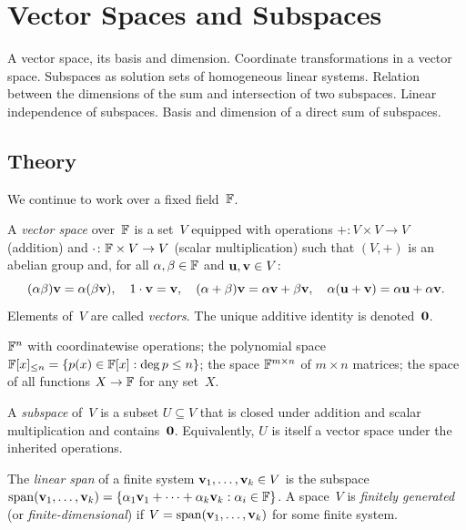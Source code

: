 
\section{Vector Spaces and Subspaces}
\label{sec:1.1.04-vector-spaces}

\begin{ticket}
A vector space, its basis and dimension. Coordinate transformations in a vector space. Subspaces as solution sets of homogeneous linear systems. Relation between the dimensions of the sum and intersection of two subspaces. Linear independence of subspaces. Basis and dimension of a direct sum of subspaces.
\end{ticket}

\subsection*{Theory}

We continue to work over a fixed field~$\mathbb{F}$.

\begin{definition}
\label{def:vector-space}
A \emph{vector space} over~$\mathbb{F}$ is a set~$V$ equipped with operations
$+\colon V \times V \to V$ (addition) and
$\cdot\colon \mathbb{F} \times V \to V$ (scalar multiplication) such that
$(V, +)$ is an abelian group and, for all $\alpha, \beta \in \mathbb{F}$ and
$\mathbf{u}, \mathbf{v} \in V$:
\[
  (\alpha \beta)\mathbf{v} = \alpha(\beta \mathbf{v}), \quad
  1 \cdot \mathbf{v} = \mathbf{v}, \quad
  (\alpha + \beta)\mathbf{v} = \alpha \mathbf{v} + \beta \mathbf{v}, \quad
  \alpha(\mathbf{u} + \mathbf{v}) = \alpha \mathbf{u} + \alpha \mathbf{v}.
\]
Elements of~$V$ are called \emph{vectors}. The unique additive identity
is denoted~$\mathbf{0}$.
\end{definition}

\begin{example}
\label{ex:vector-space-examples}
$\mathbb{F}^n$ with coordinatewise operations; the polynomial space
$\mathbb{F}[x]_{\le n} = \{p(x) \in \mathbb{F}[x] : \deg p \le n\}$; the space
$\mathbb{F}^{m \times n}$ of $m \times n$ matrices; the space of all
functions $X \to \mathbb{F}$ for any set~$X$.
\end{example}

\begin{definition}
\label{def:subspace}
A \emph{subspace} of~$V$ is a subset $U \subseteq V$ that is closed
under addition and scalar multiplication and contains~$\mathbf{0}$.
Equivalently, $U$ is itself a vector space under the inherited
operations.

The \emph{linear span} of a finite system $\mathbf{v}_1, \dots, \mathbf{v}_k \in V$
is the subspace
$\operatorname{span}(\mathbf{v}_1, \dots, \mathbf{v}_k) = \{\alpha_1 \mathbf{v}_1 + \dots + \alpha_k \mathbf{v}_k : \alpha_i \in \mathbb{F}\}$.
A space~$V$ is \emph{finitely generated} (or \emph{finite-dimensional})
if $V = \operatorname{span}(\mathbf{v}_1, \dots, \mathbf{v}_k)$ for some finite system.
\end{definition}

